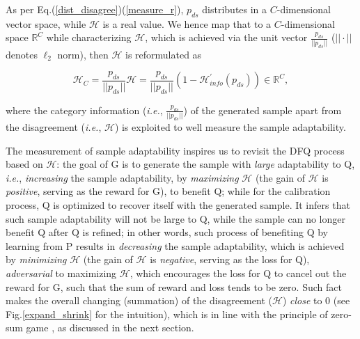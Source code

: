 As per Eq.(\ref{dist_disagree})(\ref{measure_r}), $p_{ds}$ distributes in a $C$-dimensional vector space, while $\mathcal{H}$ is a real value.
We hence map that to a $C$-dimensional space $\mathbb{R}^{C}$ while characterizing $\mathcal{H}$, which is achieved via the unit vector $\frac{p_{ds}}{||p_{ds}||}$ ($||\cdot||$ denotes $\ell_2$ norm), then $\mathcal{H}$ is reformulated as
\begin{small}
\begin{equation}
\mathcal{H}_C= \frac{p_{ds}}{||p_{ds}||}\mathcal{H}=\frac{p_{ds}}{||p_{ds}||} (1-\mathcal{H}^{'}_{info}(p_{ds})) \in \mathbb{R}^{C},
\label{h_c}
\end{equation}
\end{small}
where the category information (\emph{i.e.}, $\frac{p_{ds}}{||p_{ds}||}$) of the generated sample apart from the disagreement (\emph{i.e.}, $\mathcal{H}$) is exploited to well measure the sample adaptability.

The measurement of sample adaptability inspires us to revisit the DFQ process based on $\mathcal{H}$: the goal of G is to generate the sample with \emph{large} adaptability to Q,  \emph{i.e.}, \emph{increasing} the sample adaptability, by \emph{maximizing} $\mathcal{H}$ (the gain of $\mathcal{H}$ is \emph{positive}, serving as the reward for G),  to benefit Q; while for the calibration process, Q is optimized to recover itself with the generated sample. It infers that such sample adaptability will not be large to Q, while the sample can no longer benefit Q after Q is refined;  in other words, such process of benefiting Q by learning from P results in \emph{decreasing} the sample adaptability, which is achieved by \emph{minimizing} $\mathcal{H}$ (the gain of $\mathcal{H}$ is \emph{negative}, serving as the loss for Q), \emph{adversarial} to maximizing $\mathcal{H}$, which encourages the loss for Q to cancel out the reward for G, such that the sum of reward and loss tends to be zero. Such fact makes the overall changing (summation) of the disagreement ($\mathcal{H}$) \textit{close} to 0 (see Fig.\ref{expand_shrink} for the intuition), which is in line with the principle of zero-sum game  \cite{shoham2008multiagent,v1928theorie},  as discussed in the next section. 






